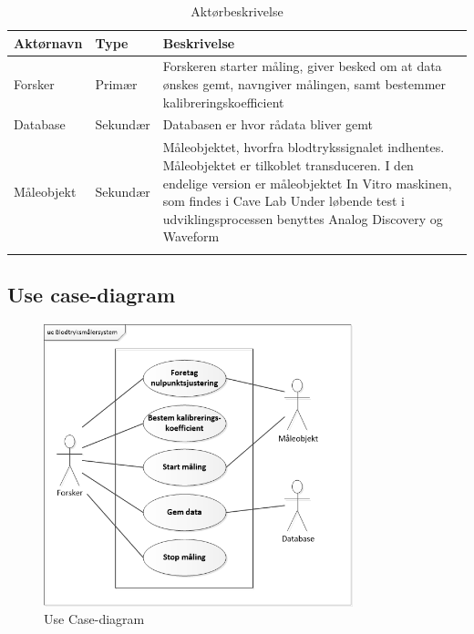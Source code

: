 \begin{table}[H]
\begin{tabularx}{\textwidth}{l l X}
     Aktørnavn	&	Type		&	Beskrivelse \\ \midrule
     Forsker   	& 	Primær  	& 	Forskeren starter måling, giver besked om at data ønskes gemt, navngiver målingen, samt bestemmer kalibreringskoefficient  \\ 			  \addlinespace[2mm]
     Database	&	Sekundær	&	Databasen er hvor rådata bliver gemt \\   \addlinespace[2mm]
     Måleobjekt	&	Sekundær	&	Måleobjektet, hvorfra blodtrykssignalet indhentes. Måleobjektet er tilkoblet transduceren.
     I den endelige version er måleobjektet In Vitro maskinen, som findes i Cave Lab
     Under løbende test i udviklingsprocessen benyttes Analog Discovery og Waveform \\   \addlinespace[2mm]
     
   
     \bottomrule                                                                                                                   
    \end{tabularx}
    \caption {Aktørbeskrivelse}
    \label{tab:aktoerbeskrivelse}
	
\end{table}

\subsection{Use case-diagram}

\begin{figure}[H]
	\centering
	\includegraphics[width=0.8\textwidth]{Figurer/UseCasediagram}
	\caption{Use Case-diagram}
	\label{fig:Use Cases}
\end{figure}

